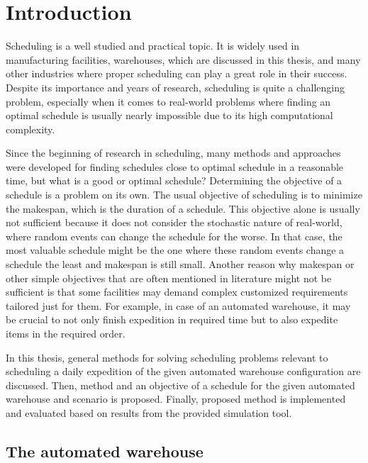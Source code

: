 \documentclass{ctuthesis}
\begin{document}
\maketitle

\chapter{Introduction}

Scheduling is a well studied and practical topic. It is widely used in manufacturing facilities, warehouses, which are discussed in this thesis, and many other industries where proper scheduling can play a great role in their success. Despite its importance and years of research, scheduling is quite a challenging problem, especially when it comes to real-world problems where finding an optimal schedule is usually nearly impossible due to its high computational complexity. 

Since the beginning of research in scheduling, many methods and approaches were developed for finding schedules close to optimal schedule in a reasonable time, but what is a good or optimal schedule? Determining the objective of a schedule is a problem on its own. The usual objective of scheduling is to minimize the makespan, which is the duration of a schedule. This objective alone is usually not sufficient because it does not consider the stochastic nature of real-world, where random events can change the schedule for the worse. In that case, the most valuable schedule might be the one where these random events change a schedule the least and makespan is still small. Another reason why makespan or other simple objectives that are often mentioned in literature might not be sufficient is that some facilities may demand complex customized requirements tailored just for them. For example, in case of an automated warehouse, it may be crucial to not only finish expedition in required time but to also expedite items in the required order. 

In this thesis, general methods for solving scheduling problems relevant to scheduling a daily expedition of the given automated warehouse configuration are discussed. Then, method and an objective of a schedule for the given automated warehouse and scenario is proposed. Finally, proposed method is implemented and evaluated based on results from the provided simulation tool. 

\section{The automated warehouse}
\end{document}
